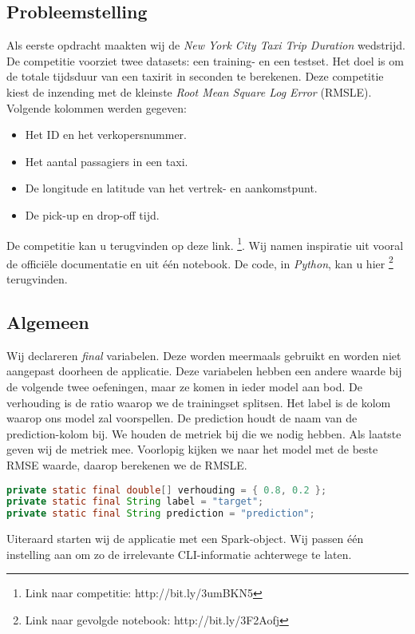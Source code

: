 \documentclass[a4paper,10pt,twoside]{report}
\begin{document}
\subsection*{Probleemstelling}

Als eerste opdracht maakten wij de \textit{New York City Taxi Trip Duration}  wedstrijd. De competitie voorziet twee datasets: een training- en een testset. Het doel is om de totale tijdsduur van een taxirit in seconden te berekenen. Deze competitie kiest de inzending met de kleinste \textit{Root Mean Square Log Error} (RMSLE). Volgende kolommen werden gegeven: 
\begin{itemize}
	\item Het ID en het verkopersnummer.
	\item Het aantal passagiers in een taxi.
	\item De longitude en latitude van het vertrek- en aankomstpunt.
	\item De pick-up en drop-off tijd.
\end{itemize}

De competitie kan u terugvinden op deze link. \footnote{Link naar competitie: http://bit.ly/3umBKN5}. Wij namen inspiratie uit vooral de officiële documentatie en uit één notebook. De code, in \textit{Python}, kan u hier \footnote{Link naar gevolgde notebook: http://bit.ly/3F2Aofj} terugvinden.

\subsection*{Algemeen}
Wij declareren \textit{final} variabelen. Deze worden meermaals gebruikt en worden niet aangepast doorheen de applicatie. Deze variabelen hebben een andere waarde bij de volgende twee oefeningen, maar ze komen in ieder model aan bod. De verhouding is de ratio waarop we de trainingset splitsen. Het label is de kolom waarop ons model zal voorspellen. De prediction houdt de naam van de prediction-kolom bij. We houden de metriek bij die we nodig hebben. Als laatste geven wij de metriek mee. Voorlopig kijken we naar het model met de beste RMSE waarde, daarop berekenen we de RMSLE.

\begin{lstlisting}[language=Java]
private static final double[] verhouding = { 0.8, 0.2 };
private static final String label = "target";
private static final String prediction = "prediction";
\end{lstlisting}

Uiteraard starten wij de applicatie met een Spark-object. Wij passen één instelling aan om zo de irrelevante CLI-informatie achterwege te laten.
\end{document}
